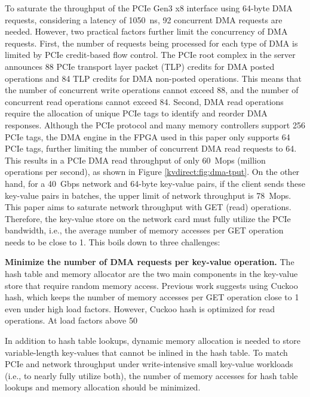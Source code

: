 To saturate the throughput of the PCIe Gen3 x8 interface using 64-byte DMA requests, considering a latency of 1050~ns, 92 concurrent DMA requests are needed. However, two practical factors further limit the concurrency of DMA requests. First, the number of requests being processed for each type of DMA is limited by PCIe credit-based flow control. The PCIe root complex in the server announces 88 PCIe transport layer packet (TLP) credits for DMA posted operations and 84 TLP credits for DMA non-posted operations. This means that the number of concurrent write operations cannot exceed 88, and the number of concurrent read operations cannot exceed 84. Second, DMA read operations require the allocation of unique PCIe tags to identify and reorder DMA responses. Although the PCIe protocol and many memory controllers support 256 PCIe tags, the DMA engine in the FPGA used in this paper only supports 64 PCIe tags, further limiting the number of concurrent DMA read requests to 64. This results in a PCIe DMA read throughput of only 60~Mops (million operations per second), as shown in Figure \ref{kvdirect:fig:dma-tput}. On the other hand, for a 40~Gbps network and 64-byte key-value pairs, if the client sends these key-value pairs in batches, the upper limit of network throughput is 78~Mops. This paper aims to saturate network throughput with GET (read) operations. Therefore, the key-value store on the network card must fully utilize the PCIe bandwidth, i.e., the average number of memory accesses per GET operation needs to be close to 1. This boils down to three challenges:

\textbf{Minimize the number of DMA requests per key-value operation.} The hash table and memory allocator are the two main components in the key-value store that require random memory access. Previous work suggests using Cuckoo hash, which keeps the number of memory accesses per GET operation close to 1 even under high load factors. However, Cuckoo hash is optimized for read operations. At load factors above 50%

In addition to hash table lookups, dynamic memory allocation is needed to store variable-length key-values that cannot be inlined in the hash table. To match PCIe and network throughput under write-intensive small key-value workloads (i.e., to nearly fully utilize both), the number of memory accesses for hash table lookups and memory allocation should be minimized.

